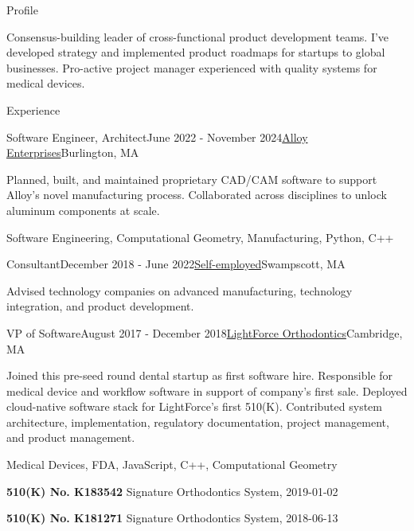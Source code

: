 \documentclass{resume}
\begin{document}
  
\begin{rSection}{Profile}
\item Consensus-building leader of cross-functional product development teams. I've developed strategy and implemented product roadmaps for startups to global businesses. Pro-active project manager experienced with quality systems for medical devices.
\end{rSection}

\begin{rSection}{Experience}

\begin{rSubsection}{Software Engineer, Architect}{June 2022 - November 2024}{\href{https://alloyenterprises.co}{Alloy Enterprises}}{Burlington, MA}
\item Planned, built, and maintained proprietary CAD/CAM software to support Alloy's novel manufacturing process. Collaborated across disciplines to unlock aluminum components at scale.
\item Software Engineering, Computational Geometry, Manufacturing, Python, C++
\end{rSubsection}

\begin{rSubsection}{Consultant}{December 2018 - June 2022}{\href{https://metatooth.com/services}{Self-employed}}{Swampscott, MA}
\item Advised technology companies on advanced manufacturing, technology integration, and product development.
\end{rSubsection}

\begin{rSubsection}{VP of Software}{August 2017 - December 2018}{\href{https://lightforceortho.com}{LightForce Orthodontics}}{Cambridge, MA}
\item Joined this pre-seed round dental startup as first software hire. Responsible for medical device and workflow software in support of company's first sale. Deployed cloud-native software stack for LightForce's first 510(K). Contributed system architecture, implementation, regulatory documentation, project management, and product management.
\item Medical Devices, FDA, JavaScript, C++, Computational Geometry
\item \textbf{510(K) No. K183542} Signature Orthodontics System, 2019-01-02
\item \textbf{510(K) No. K181271} Signature Orthodontics System, 2018-06-13
\end{rSubsection}



\end{rSection}
\end{document}
